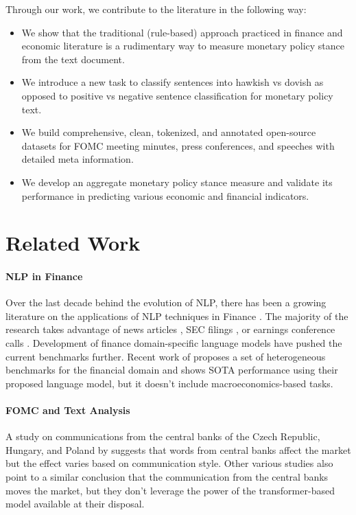 \documentclass[11pt]{article}
\begin{document}
Through our work, we contribute to the literature in the following way:
\begin{itemize}
    \item We show that the traditional (rule-based) approach practiced in finance and economic literature is a rudimentary way to measure monetary policy stance from the text document. 
    \item We introduce a new task to classify sentences into hawkish vs dovish as opposed to positive vs negative sentence classification for monetary policy text.
    \item We build comprehensive, clean, tokenized, and annotated open-source datasets for FOMC meeting minutes, press conferences, and speeches with detailed meta information. 
    \item We develop an aggregate monetary policy stance measure and validate its performance in predicting various economic and financial indicators. 
\end{itemize}


\section{Related Work}


\paragraph{NLP in Finance} Over the last decade behind the evolution of NLP, there has been a growing literature on the applications of NLP techniques in Finance \citep{loughran2011liability, sohangir2018big, xing2018natural, chava2022measuring}. The majority of the research takes advantage of news articles \citep{vargas2017deep, caldara2022measuring}, SEC filings \citep{loughran2011liability, chava2016december, alanis2022benchmarking}, or earnings conference calls \citep{bowen2002conference, bushee2003open, chava2019buzzwords, li2020maec}. Development of finance domain-specific language models \citep{orig_finbert, finbert, liu2020finbert} have pushed the current benchmarks further. Recent work of \citet{shah-etal-2022-flang} proposes a set of heterogeneous benchmarks for the financial domain and shows SOTA performance using their proposed language model, but it doesn't include macroeconomics-based tasks.  

\paragraph{FOMC and Text Analysis} A study on communications from the central banks of the Czech Republic, Hungary, and Poland by \citet{rozkrut2007quest} suggests that words from central banks affect the market but the effect varies based on communication style. Other various studies \citep{tobback2017between, hansen2018transparency, nakamura2018high, cieslak2019stock, schmeling2019does, tsukioka2020tone, ehrmann2020starting, bennani2020does, gorodnichenko2021voice} also point to a similar conclusion that the communication from the central banks moves the market, but they don't leverage the power of the transformer-based model available at their disposal. 
\end{document}
